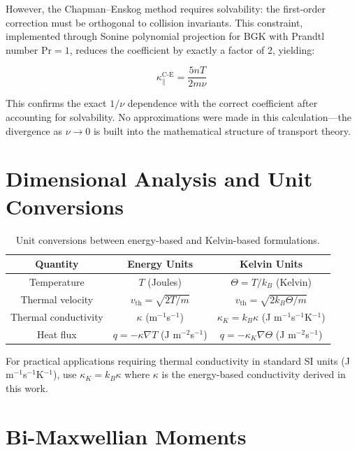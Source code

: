 \documentclass[12pt,a4paper]{article}
\begin{document}
However, the Chapman--Enskog method requires solvability: the first-order correction must be orthogonal to collision invariants. This constraint, implemented through Sonine polynomial projection for BGK with Prandtl number $\text{Pr} = 1$, reduces the coefficient by exactly a factor of 2, yielding:

\begin{equation}
\boxed{\kappa_{\parallel}^{\text{C-E}} = \frac{5nT}{2m\nu}}
\label{eq:kappa_ce_appendix}
\end{equation}

This confirms the exact $1/\nu$ dependence with the correct coefficient after accounting for solvability. No approximations were made in this calculation—the divergence as $\nu \to 0$ is built into the mathematical structure of transport theory.

\section{Dimensional Analysis and Unit Conversions}

\begin{table}[h]
\centering
\begin{tabular}{|c|c|c|}
\hline
Quantity & Energy Units & Kelvin Units \\
\hline
Temperature & $T$ (Joules) & $\Theta = T/k_B$ (Kelvin) \\
Thermal velocity & $v_{\text{th}} = \sqrt{2T/m}$ & $v_{\text{th}} = \sqrt{2k_B\Theta/m}$ \\
Thermal conductivity & $\kappa$ (m$^{-1}$s$^{-1}$) & $\kappa_K = k_B\kappa$ (J m$^{-1}$s$^{-1}$K$^{-1}$) \\
Heat flux & $q = -\kappa\nabla T$ (J m$^{-2}$s$^{-1}$) & $q = -\kappa_K\nabla\Theta$ (J m$^{-2}$s$^{-1}$) \\
\hline
\end{tabular}
\caption{Unit conversions between energy-based and Kelvin-based formulations.}
\label{tab:units}
\end{table}

For practical applications requiring thermal conductivity in standard SI units (J m$^{-1}$s$^{-1}$K$^{-1}$), use $\kappa_K = k_B \kappa$ where $\kappa$ is the energy-based conductivity derived in this work.

\section{Bi-Maxwellian Moments}
\end{document}
